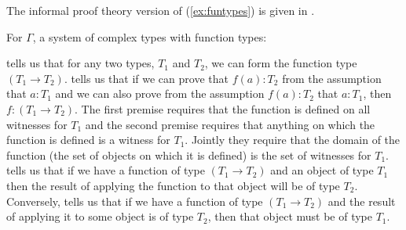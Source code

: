 The informal proof theory version of (\ref{ex:funtypes}) is given in
\nexteg{}.
\begin{ex} 
For $\Gamma$, a system of complex types with function types:
\begin{subex} 
 
\item \begin{prooftree}
\end{prooftree}
 
\item \begin{prooftree}
\end{prooftree} 

\item \begin{prooftree}
\end{prooftree}

\item \begin{prooftree}
\end{prooftree}
 
\end{subex} 
  
\end{ex} 
 tells us that for any two types, $T_1$ and $T_2$, we can
form the function type $(T_1\rightarrow T_2)$.   tells us
that if we can prove that $f(a):T_2$ from the assumption that $a:T_1$
and we can also prove from the assumption $f(a):T_2$ that $a:T_1$,
then $f:(T_1\rightarrow T_2)$.  The first premise requires that the
function is defined on all witnesses for $T_1$ and the second premise
requires that anything on which the function is defined is a witness
for $T_1$.  Jointly they require that the domain of the function (the
set of objects on which it is defined) is the set of witnesses for
$T_1$.   tells us that if we have a function of type
$(T_1\rightarrow T_2)$ and an object of type $T_1$ then the result of
applying the function to that object will be of type $T_2$.
Conversely,  tells us that if we have a function of type
$(T_1\rightarrow T_2)$ and the result of applying it to some object is
of type $T_2$, then that object must be of type $T_1$.  

